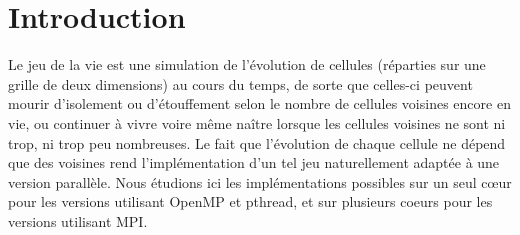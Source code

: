 \section*{Introduction}

Le jeu de la vie est une simulation de l'évolution de cellules (réparties sur une grille de deux dimensions) au cours du temps, de sorte que celles-ci peuvent mourir d'isolement ou d'étouffement selon le nombre de cellules voisines encore en vie, ou continuer à vivre voire même naître lorsque les cellules voisines ne sont ni trop, ni trop peu nombreuses. Le fait que l'évolution de chaque cellule ne dépend que des voisines rend l'implémentation d'un tel jeu naturellement adaptée à une version parallèle. Nous étudions ici les implémentations possibles sur un seul c\oe ur pour les versions utilisant OpenMP et pthread, et sur plusieurs coeurs pour les versions utilisant MPI.